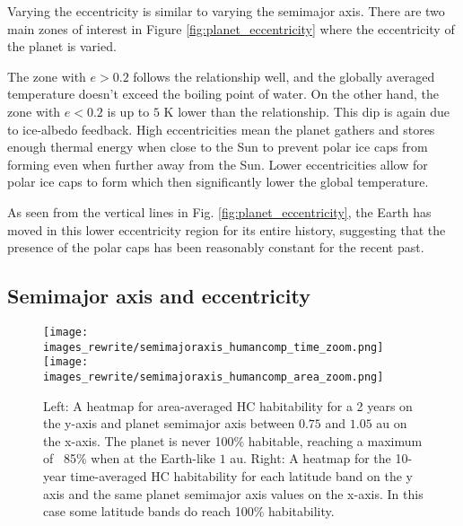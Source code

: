 \documentclass[12pt, onecolumn]{revtex4-2}    %
\begin{document}
Varying the eccentricity is similar to varying the semimajor axis.
There are two main zones of interest in Figure \ref{fig:planet_eccentricity} where the eccentricity of the planet is varied.

The zone with $e > 0.2$ follows the relationship well, and the globally averaged temperature doesn't exceed the boiling point of water.
On the other hand, the zone with $e < 0.2$ is up to $5$ K lower than the relationship.
This dip is again due to ice-albedo feedback.
High eccentricities mean the planet gathers and stores enough thermal energy when close to the Sun to prevent polar ice caps from forming even when further away from the Sun.
Lower eccentricities allow for polar ice caps to form which then significantly lower the global temperature.

As seen from the vertical lines in Fig. \ref{fig:planet_eccentricity}, the Earth has moved in this lower eccentricity region for its entire history, suggesting that the presence of the polar caps has been reasonably constant for the recent past.

\subsection{Semimajor axis and eccentricity} \label{ssec:qualitative_semimajoraxis_eccentricity}
\begin{figure}
  \texttt{[image: images\_rewrite/semimajoraxis\_humancomp\_time\_zoom.png]}
  \texttt{[image: images\_rewrite/semimajoraxis\_humancomp\_area\_zoom.png]}
  \caption{
    Left: A heatmap for area-averaged HC habitability for a 2 years on the y-axis and planet semimajor axis between $0.75$ and $1.05$ au on the x-axis.
    The planet is never 100\% habitable, reaching a maximum of ~85\% when at the Earth-like $1$ au.
    Right: A heatmap for the 10-year time-averaged HC habitability for each latitude band on the y axis and the same planet semimajor axis values on the x-axis.
    In this case some latitude bands do reach 100\% habitability.
  }
  \label{fig:qualitative_semimajoraxis}
\end{figure}
\end{document}
